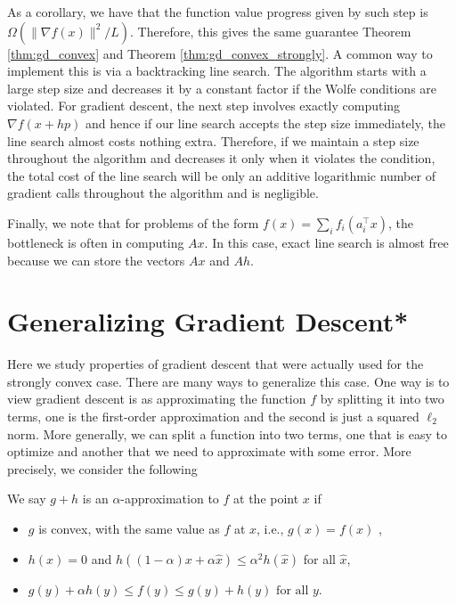 As a corollary, we have that the function value progress given by
such step is $\Omega(\|\nabla f(x)\|^{2}/L)$. Therefore, this gives
the same guarantee Theorem \ref{thm:gd_convex} and Theorem \ref{thm:gd_convex_strongly}.
A common way to implement this is via a backtracking line search.
The algorithm starts with a large step size and decreases it by a
constant factor if the Wolfe conditions are violated. For gradient
descent, the next step involves exactly computing $\nabla f(x+hp)$
and hence if our line search accepts the step size immediately, the
line search almost costs nothing extra. Therefore, if we maintain
a step size throughout the algorithm and decreases it only when it
violates the condition, the total cost of the line search will be
only an additive logarithmic number of gradient calls throughout the
algorithm and is negligible.

Finally, we note that for problems of the form $f(x)=\sum_{i}f_{i}(a_{i}^{\top}x)$,
the bottleneck is often in computing $Ax$. In this case, exact line
search is almost free because we can store the vectors $Ax$ and $Ah$.

\section{Generalizing Gradient Descent{*}}

Here we study properties of gradient descent that were actually used
for the strongly convex case. There are many ways to generalize this
case. One way is to view gradient descent is as approximating the
function $f$ by splitting it into two terms, one is the first-order
approximation and the second is just a squared $\ell_{2}$ norm. More
generally, we can split a function into two terms, one that is easy
to optimize and another that we need to approximate with some error.
More precisely, we consider the following 
\begin{defn}
We say $g+h$ is an $\alpha$-approximation to $f$ at the point $x$
if
\begin{itemize}
\item $g$ is convex, with the same value as $f$ at $x$, i.e., $g(x)=f(x)$
,
\item $h(x)=0$ and $h((1-\alpha)x+\alpha\widehat{x})\leq\alpha^{2}h(\widehat{x})$
for all $\widehat{x}$,
\item $g(y)+\alpha h(y)\leq f(y)\leq g(y)+h(y)\text{ for all }y.$ 
\end{itemize}
\end{defn}

